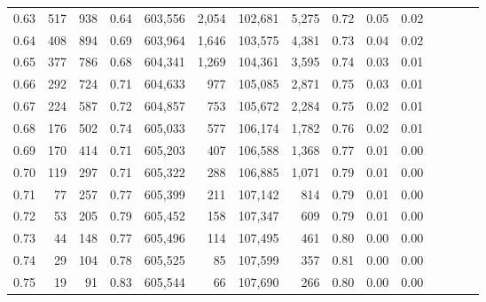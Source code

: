 \begin{tabular}{rrrcrrrrrrrrrrr}
0.63 &     517 &    938 &                                       0.64 &  603,556 &    2,054 &  102,681 &    5,275 &  0.72 &  0.05 &                         0.02 \\
0.64 &     408 &    894 &                                       0.69 &  603,964 &    1,646 &  103,575 &    4,381 &  0.73 &  0.04 &                         0.02 \\
0.65 &     377 &    786 &                                       0.68 &  604,341 &    1,269 &  104,361 &    3,595 &  0.74 &  0.03 &                         0.01 \\
0.66 &     292 &    724 &                                       0.71 &  604,633 &      977 &  105,085 &    2,871 &  0.75 &  0.03 &                         0.01 \\
0.67 &     224 &    587 &                                       0.72 &  604,857 &      753 &  105,672 &    2,284 &  0.75 &  0.02 &                         0.01 \\
0.68 &     176 &    502 &                                       0.74 &  605,033 &      577 &  106,174 &    1,782 &  0.76 &  0.02 &                         0.01 \\
0.69 &     170 &    414 &                                       0.71 &  605,203 &      407 &  106,588 &    1,368 &  0.77 &  0.01 &                         0.00 \\
0.70 &     119 &    297 &                                       0.71 &  605,322 &      288 &  106,885 &    1,071 &  0.79 &  0.01 &                         0.00 \\
0.71 &      77 &    257 &                                       0.77 &  605,399 &      211 &  107,142 &      814 &  0.79 &  0.01 &                         0.00 \\
0.72 &      53 &    205 &                                       0.79 &  605,452 &      158 &  107,347 &      609 &  0.79 &  0.01 &                         0.00 \\
0.73 &      44 &    148 &                                       0.77 &  605,496 &      114 &  107,495 &      461 &  0.80 &  0.00 &                         0.00 \\
0.74 &      29 &    104 &                                       0.78 &  605,525 &       85 &  107,599 &      357 &  0.81 &  0.00 &                         0.00 \\
0.75 &      19 &     91 &                                       0.83 &  605,544 &       66 &  107,690 &      266 &  0.80 &  0.00 &                         0.00 \\

\end{tabular}
